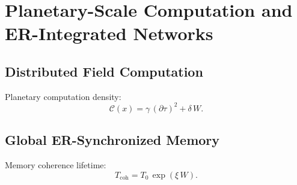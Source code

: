 \chapter{Planetary-Scale Computation and ER-Integrated Networks}

\section{Distributed Field Computation}
Planetary computation density:
\[
\mathcal{C}(x)=\gamma\,(\partial\tau)^2 + \delta\,W.
\]

\section{Global ER-Synchronized Memory}
Memory coherence lifetime:
\[
T_{\mathrm{coh}} = T_0\,\exp(\xi\, W).
\]
